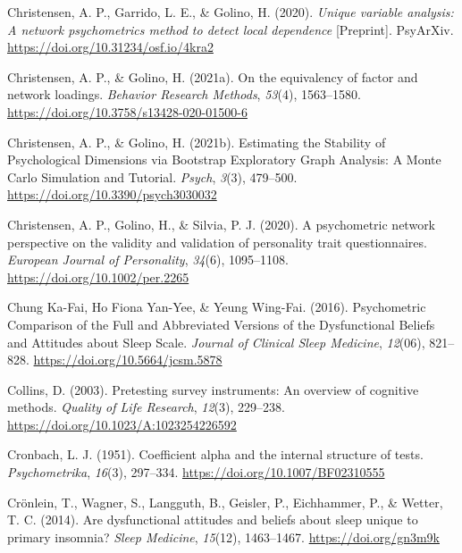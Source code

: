 \documentclass[
  ,doc,11pt, twoside,floatsintext]{apa6}
\newlength{\cslhangindent}
\newlength{\cslentryspacingunit} %
\newenvironment{CSLReferences}[2] %
 {%
  \setlength{\parindent}{0pt}
  \ifodd #1
  \let\oldpar\par
  \def\par{\hangindent=\cslhangindent\oldpar}
  \fi
  \setlength{\parskip}{#2\cslentryspacingunit}
 }%
 {}
\begin{document}
\begin{CSLReferences}{1}{0}
\leavevmode{}%
Christensen, A. P., Garrido, L. E., \& Golino, H. (2020). \emph{Unique variable analysis: {A} network psychometrics method to detect local dependence} {[}Preprint{]}. {PsyArXiv}. \url{https://doi.org/10.31234/osf.io/4kra2}

\leavevmode{}%
Christensen, A. P., \& Golino, H. (2021a). On the equivalency of factor and network loadings. \emph{Behavior Research Methods}, \emph{53}(4), 1563--1580. \url{https://doi.org/10.3758/s13428-020-01500-6}

\leavevmode{}%
Christensen, A. P., \& Golino, H. (2021b). Estimating the {Stability} of {Psychological Dimensions} via {Bootstrap Exploratory Graph Analysis}: {A Monte Carlo Simulation} and {Tutorial}. \emph{Psych}, \emph{3}(3), 479--500. \url{https://doi.org/10.3390/psych3030032}

\leavevmode{}%
Christensen, A. P., Golino, H., \& Silvia, P. J. (2020). A psychometric network perspective on the validity and validation of personality trait questionnaires. \emph{European Journal of Personality}, \emph{34}(6), 1095--1108. \url{https://doi.org/10.1002/per.2265}

\leavevmode{}%
Chung Ka-Fai, Ho Fiona Yan-Yee, \& Yeung Wing-Fai. (2016). Psychometric {Comparison} of the {Full} and {Abbreviated Versions} of the {Dysfunctional Beliefs} and {Attitudes} about {Sleep Scale}. \emph{Journal of Clinical Sleep Medicine}, \emph{12}(06), 821--828. \url{https://doi.org/10.5664/jcsm.5878}

\leavevmode{}%
Collins, D. (2003). Pretesting survey instruments: {An} overview of cognitive methods. \emph{Quality of Life Research}, \emph{12}(3), 229--238. \url{https://doi.org/10.1023/A:1023254226592}

\leavevmode{}%
Cronbach, L. J. (1951). Coefficient alpha and the internal structure of tests. \emph{Psychometrika}, \emph{16}(3), 297--334. \url{https://doi.org/10.1007/BF02310555}

\leavevmode{}%
Crönlein, T., Wagner, S., Langguth, B., Geisler, P., Eichhammer, P., \& Wetter, T. C. (2014). Are dysfunctional attitudes and beliefs about sleep unique to primary insomnia? \emph{Sleep Medicine}, \emph{15}(12), 1463--1467. \url{https://doi.org/gn3m9k}


\end{CSLReferences}
\end{document}
